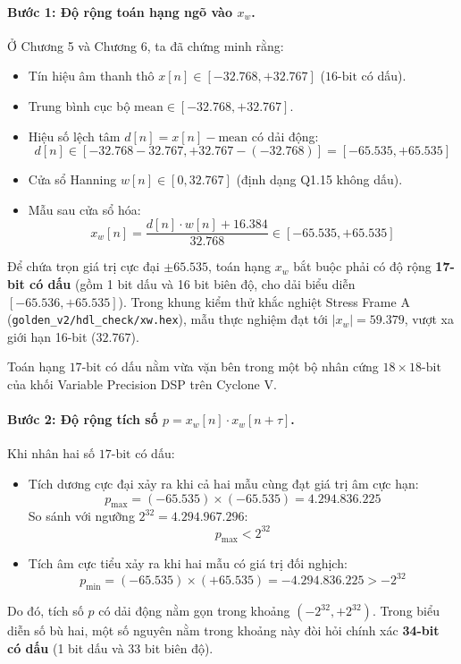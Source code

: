 \paragraph{Bước 1: Độ rộng toán hạng ngõ vào $x_w$.}
Ở Chương 5 và Chương 6, ta đã chứng minh rằng:
\begin{itemize}[leftmargin=1.5em, itemsep=2pt]
    \item Tín hiệu âm thanh thô $x[n] \in [-32.768, +32.767]$ ($16\text{-bit}$ có dấu).
    \item Trung bình cục bộ $\text{mean} \in [-32.768, +32.767]$.
    \item Hiệu số lệch tâm $d[n] = x[n] - \text{mean}$ có dải động:
    \begin{equation}
    d[n] \in [-32.768 - 32.767, +32.767 - (-32.768)] = [-65.535, +65.535]
    \end{equation}
    \item Cửa sổ Hanning $w[n] \in [0, 32.767]$ (định dạng Q1.15 không dấu).
    \item Mẫu sau cửa sổ hóa:
    \begin{equation}
    x_w[n] = \frac{d[n] \cdot w[n] + 16.384}{32.768} \in [-65.535, +65.535]
    \end{equation}
\end{itemize}
Để chứa trọn giá trị cực đại $\pm 65.535$, toán hạng $x_w$ bắt buộc phải có độ rộng \textbf{17-bit có dấu} (gồm 1 bit dấu và 16 bit biên độ, cho dải biểu diễn $[-65.536, +65.535]$). Trong khung kiểm thử khắc nghiệt Stress Frame A (\texttt{golden\_v2/hdl\_check/xw.hex}), mẫu thực nghiệm đạt tới $|x_w| = 59.379$, vượt xa giới hạn 16-bit ($32.767$).

Toán hạng $17\text{-bit}$ có dấu nằm vừa vặn bên trong một bộ nhân cứng $18 \times 18\text{-bit}$ của khối Variable Precision DSP trên Cyclone V.

\paragraph{Bước 2: Độ rộng tích số $p = x_w[n] \cdot x_w[n+\tau]$.}
Khi nhân hai số $17\text{-bit}$ có dấu:
\begin{itemize}[leftmargin=1.5em, itemsep=2pt]
    \item Tích dương cực đại xảy ra khi cả hai mẫu cùng đạt giá trị âm cực hạn:
    \begin{equation}
    p_{\max} = (-65.535) \times (-65.535) = \mathbf{4.294.836.225}
    \end{equation}
    So sánh với ngưỡng $2^{32} = 4.294.967.296$:
    \begin{equation}
    p_{\max} < 2^{32}
    \end{equation}
    \item Tích âm cực tiểu xảy ra khi hai mẫu có giá trị đối nghịch:
    \begin{equation}
    p_{\min} = (-65.535) \times (+65.535) = \mathbf{-4.294.836.225} > -2^{32}
    \end{equation}
\end{itemize}
Do đó, tích số $p$ có dải động nằm gọn trong khoảng $(-2^{32}, +2^{32})$. Trong biểu diễn số bù hai, một số nguyên nằm trong khoảng này đòi hỏi chính xác \textbf{34-bit có dấu} (1 bit dấu và 33 bit biên độ).

